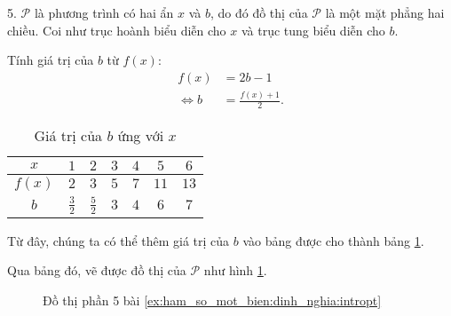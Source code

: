 {
   \begin{minipageindent}{0.48\textwidth}
      5. $\mathcal{P}$ là phương trình có hai ẩn $x$ và $b$, do đó đồ thị của $\mathcal{P}$ là một mặt phẳng hai chiều. Coi như trục hoành biểu diễn cho $x$ và trục tung biểu diễn cho $b$.

      Tính giá trị của $b$ từ $f(x)$:
      \begin{align*}
         f(x) &= 2b - 1 \\
         \iff b &= \frac{f(x) + 1}{2}.
      \end{align*}
   \end{minipageindent}
   \hfill
   \begin{minipageindent}{0.48\textwidth}
      \begin{table}[H]
         \centering
         \begin{tabular}{|c|c|c|c|c|c|c|}
            \hline
            $x$ & $1$ & $2$ & $3$ & $4$ & $5$ & $6$\\
            \hline
            $f(x)$ & $2$ & $3$ & $5$ & $7$ & $11$ & $13$\\
            \hline
            $b$ & $\frac{3}{2}$ & $\frac{5}{2}$ & $3$ & $4$ & $6$ & $7$\\
            \hline
         \end{tabular}
         \caption{Giá trị của $b$ ứng với $x$}
         \label{tab:ham_so_mot_bien:dinh_nghia:b_values6}
      \end{table}
   \end{minipageindent}
}
Từ đây, chúng ta có thể thêm giá trị của $b$ vào bảng được cho thành bảng \ref{tab:ham_so_mot_bien:dinh_nghia:b_values6}. 

Qua bảng đó, vẽ được đồ thị của $\mathcal{P}$ như hình \ref{fig:ham_so_mot_bien:dinh_nghia:dtp5}.


\begin{figure}[H]
   \centering
   \caption{Đồ thị phần 5 bài \ref{ex:ham_so_mot_bien:dinh_nghia:intropt}}
   \label{fig:ham_so_mot_bien:dinh_nghia:dtp5}
\end{figure}

